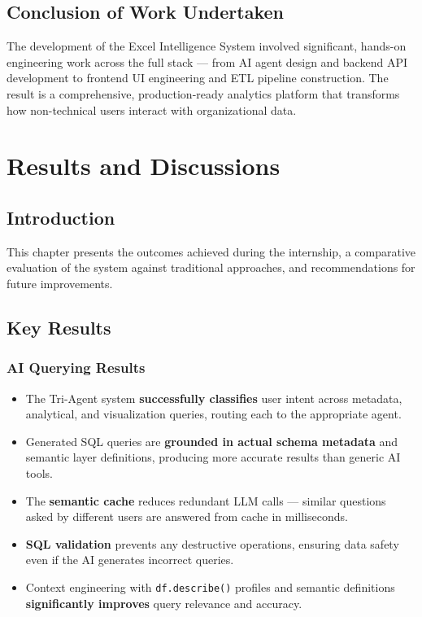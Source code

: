 \documentclass[12pt,a4paper]{report}
\begin{document}
\section{Conclusion of Work Undertaken}

The development of the Excel Intelligence System involved significant, hands-on engineering work across the full stack --- from AI agent design and backend API development to frontend UI engineering and ETL pipeline construction. The result is a comprehensive, production-ready analytics platform that transforms how non-technical users interact with organizational data.

\chapter{Results and Discussions}

\section{Introduction}

This chapter presents the outcomes achieved during the internship, a comparative evaluation of the system against traditional approaches, and recommendations for future improvements.

\section{Key Results}

\subsection{AI Querying Results}

\begin{itemize}[leftmargin=1.5cm]
    \item The Tri-Agent system \textbf{successfully classifies} user intent across metadata, analytical, and visualization queries, routing each to the appropriate agent.
    \item Generated SQL queries are \textbf{grounded in actual schema metadata} and semantic layer definitions, producing more accurate results than generic AI tools.
    \item The \textbf{semantic cache} reduces redundant LLM calls --- similar questions asked by different users are answered from cache in milliseconds.
    \item \textbf{SQL validation} prevents any destructive operations, ensuring data safety even if the AI generates incorrect queries.
    \item Context engineering with \texttt{df.describe()} profiles and semantic definitions \textbf{significantly improves} query relevance and accuracy.
\end{itemize}
\end{document}

